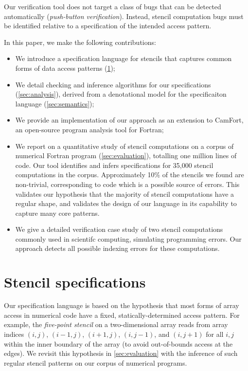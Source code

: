\documentclass[10pt,preprint]{sigplanconf}
\theoremstyle{definition}
\begin{document}
Our verification tool does not target a
class of bugs that can be detected automatically (\emph{push-button
  verification}). Instead, stencil computation bugs must be
identified relative to a specification of the intended access pattern.

In this paper, we make the following contributions:
%
\begin{itemize}
\item We introduce a specification language for stencils
  that captures common forms of data access patterns
  (\cref{sec:lang});

\item We detail checking and inference algorithms for our
  specifications (\cref{sec:analysis}), derived from a
  denotational model for the specificaiton language
  (\cref{sec:semantics});

\item We provide an implementation of our approach as an extension to
  CamFort, an open-source program analysis tool for Fortran;

\item We report on a quantitative study of stencil computations on a
  corpus of numerical Fortran program
  (\cref{sec:evaluation}), totalling one million lines of code. Our tool
  identifies and infers specifications for 35,000 stencil computations in the
  corpus. Approximately 10\% of the stencils we found are non-trivial,
  corresponding to code which is a possible source of errors. This validates
  our hypothesis that the majority of stencil computations have a regular
  shape, and validates the design of our language in its capability to capture
  many core patterns.

\item We give a detailed verification case study of two
  stencil computations commonly used in scientifc computing,
  simulating programming errors. Our approach detects all
  possible indexing errors for these computations.
\end{itemize}
%

\newcommand{\domainVal}{\mathbb{Z}_\infty}
\section{Stencil specifications}\label{sec:lang}

Our specification language is based on the hypothesis
that most forms of array access in numerical code have
a fixed, statically-determined access pattern. For example, the
\emph{five-point stencil} on a two-dimensional array reads from array
indices $(i, j)$, $(i-1, j)$, $(i+1, j)$, $(i, j-1)$, and $(i, j+1)$
for all $i, j$ within the inner boundary of the array (to avoid
out-of-bounds access at the edges). We revisit this hypothesis
in \cref{sec:evaluation} with the inference of
such regular stencil patterns on our corpus of numerical programs.
\end{document}
